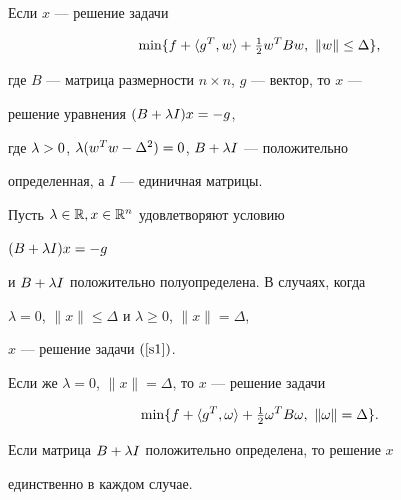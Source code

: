 \begin{thms}


Если $x$ --- решение задачи


\begin{equation}


\label{s1} 


\min\{f + \la g^T,w\ra + \tfrac{1}{2} w^T B w,


\ \|w\| \leq \Delta\},


\end{equation}


где $B$ --- матрица размерности $n \times n$, $g$ --- вектор, то $x$ ---


решение уравнения $(B+\lambda I) x = -g$,


где $\lambda>0$, $\lambda (w^T w - \Delta^2)=0$, $B+\lambda I$ --- положительно


определенная, а $I$ --- единичная матрицы.


\end{thms}





\begin{thms}


Пусть $\lambda \in \Bbb R, x \in \Bbb R^n$ удовлетворяют условию


$(B + \lambda I) x = -g$


и $B + \lambda I$ положительно полуопределена. В случаях, когда 


$\lambda=0$, $\|x\|\le\Delta$ и $\lambda\ge0$, $\|x\|=\Delta$,


$x$ --- решение задачи $(\ref{s1})$.


Если же $\lambda=0$, $\|x\|=\Delta$, то $x$ --- решение задачи


$$


\min\{f+\la g^T,\omega\ra+\tfrac{1}{2}\omega^T B\omega,


\ \|\omega\|=\Delta\}.


$$


Если матрица $B + \lambda I$ положительно определена, то решение $x$


единственно в каждом случае.


\end{thms}






